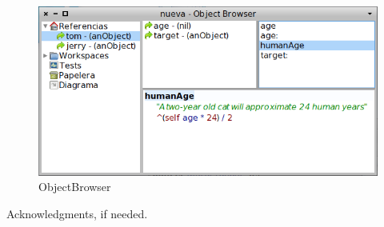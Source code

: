 \documentclass{sigplanconf}
\begin{document}
\begin{figure}[h]
 \centering
 \includegraphics[scale=.35]{./images/objectBrowser.png}
 \caption{ObjectBrowser}
 \label{fig:objectBrowser}
\end{figure}


\acks

Acknowledgments, if needed.






% 
% 
\end{document}
